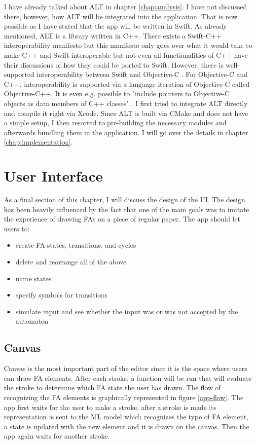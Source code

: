 I have already talked about ALT in chapter \ref{chap:analysis}. I have not discussed there, however, how ALT will be integrated into the application. That is now possible as I have stated that the app will be written in Swift. As already mentioned, ALT is a library written in C++. There exists a Swift-C++ interoperability manifesto \cite{swift-c++-manifesto} but this manifesto only goes over what it would take to make C++ and Swift interoperable but not even all functionalities of C++ have their discussions of how they could be ported to Swift. However, there is well-supported interoperability between Swift and Objective-C \cite{swift-objc-interoperability}. For Objective-C and C++, interoperability is supported via a language iteration of Objective-C called Objective-C++. It is even e.g. possible to "include pointers to Objective-C objects as data members of C++ classes" \cite{objc++}. I first tried to integrate ALT directly and compile it right via Xcode. Since ALT is built via CMake \cite{cmake} and does not have a simple setup, I then resorted to pre-building the necessary modules and afterwards bundling them in the application. I will go over the details in chapter \ref{chap:implementation}.

\section{User Interface}

As a final section of this chapter, I will discuss the design of the UI. The design has been heavily influenced by the fact that one of the main goals was to imitate the experience of drawing FAs on a piece of regular paper. The app should let users to:
\begin{itemize}
    \item create FA states, transitions, and cycles
    \item delete and rearrange all of the above
    \item name states
    \item specify symbols for transitions
    \item simulate input and see whether the input was or was not accepted by the automaton
\end{itemize}

\subsection{Canvas}

Canvas is the most important part of the editor since it is the space where users can draw FA elements. After each stroke, a function will be run that will evaluate the stroke to determine which FA state the user has drawn. The flow of recognizing the FA elements is graphically represented in figure \ref{app-flow}. The app first waits for the user to make a stroke, after a stroke is made its representation is sent to the ML model which recognizes the type of FA element, a state is updated with the new element and it is drawn on the canvas. Then the app again waits for another stroke.

